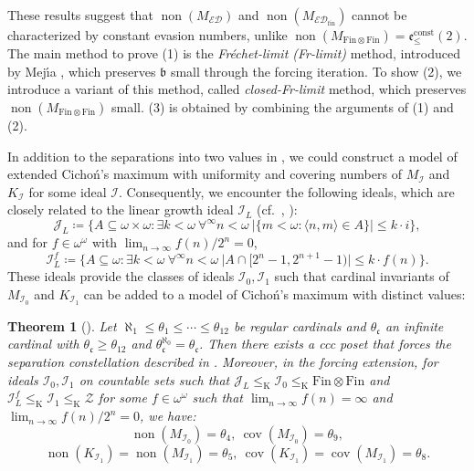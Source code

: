 \documentclass[a4paper,12pt]{amsart}
\newcounter{enuAlph}
\newtheorem{teorema}[enuAlph]{Theorem}
\theoremstyle{definition}
\numberwithin{thm}{section}
\numberwithin{equation}{section}
\newcommand{\oo}{{\omega}^\omega}
\newcommand{\bb}{\mathfrak{b}}
\newcommand{\cc}{\mathfrak{c}}
\newcommand{\ee}{\mathfrak{e}}
\DeclareMathOperator{\non}{non}
\DeclareMathOperator{\cov}{cov}
\newcommand{\ed}{\mathcal{ED}}
\newcommand{\I}{\mathscr{I}}
\newcommand{\J}{\mathscr{J}}
\newcommand{\edfin}{\mathcal{ED}_\mathrm{fin}}
\newcommand{\finfin}{\mathrm{Fin}\otimes\mathrm{Fin}}
\newcommand{\Z}{\mathcal{Z}}
\renewcommand{\subset}{\subseteq}
\newcommand{\IL}{\I_{L}}
\newcommand{\eec}{\ee^{\mathrm{const}}}
\begin{document}
    These results suggest that $\non(M_{\ed})$ and $\non(M_{\edfin})$ cannot be characterized by constant evasion numbers, unlike $\non(M_{\finfin})=\eec_{\leq}(2)$.
    The main method to prove (1) is the \emph{Fr\'{e}chet-limit (Fr-limit)} method, introduced by Mej\'{\i}a \cite{Mej19}, which preserves $\bb$ small through the forcing iteration. To show (2), we introduce a variant of this method, called \emph{closed-Fr-limit} method, which preserves $\non(M_{\finfin})$ small. (3) is obtained by combining the arguments of (1) and (2).
    
    In addition to the separations into two values in , we could construct a model of extended Cicho\'n's maximum with uniformity and covering numbers of $M_\I$ and $K_\I$ for some ideal $\I$. Consequently, we encounter the following ideals, which are closely related to the linear growth ideal $\I_L$ (cf.\ {\cite[Page 56]{Hru11}, \cite[Page 3]{BM14}}):
    \[
    \J_L \coloneqq \{A\subset\omega\times\omega: \exists k<\omega~\forall^{\infty} n<\omega~\lvert\{m<\omega\colon\langle n, m\rangle\in A\}\rvert \leq k\cdot i\},
    \]
    and for $f\in\oo$ with $\textstyle\lim_{n\to\infty}f(n)/2^n=0$,
    \[
    \IL^f\coloneqq\{A\subset\omega\colon\exists k<\omega~\forall^\infty n<\omega~\lvert A\cap [2^n-1, 2^{n+1}-1)\rvert\leq k\cdot f(n)\}.
    \]
    These ideals provide the classes of ideals $\I_0, \I_1$ such that cardinal invariants of $M_{\I_0}$ and $K_{\I_1}$ can be added to a model of Cicho\'n's maximum with distinct values: 

    \begin{teorema}[] \label{mainthm:ext_CM}
        Let $\aleph_1\leq\theta_1\leq\cdots\leq\theta_{12}$ be regular cardinals and $\theta_\cc$ an infinite cardinal with $\theta_\cc\geq\theta_{12}$ and $\theta_\cc^{\aleph_0}=\theta_\cc$. Then there exists a ccc poset that forces the separation constellation described in .
        Moreover, in the forcing extension, for ideals $\I_0, \I_1$ on countable sets such that $\J_L \leq_{\mathrm{K}} \I_0 \leq_{\mathrm{K}} \finfin$ and $\I_L^f \leq_{\mathrm{K}} \I_1 \leq_{\mathrm{K}} \Z$ for some $f\in\omega^\omega$ such that $\textstyle\lim_{n\to\infty}f(n)=\infty$ and $\textstyle\lim_{n\to\infty}f(n)/2^n=0$, we have:
        \[\non(M_{\I_0})=\theta_4,~\cov(M_{\I_0})=\theta_9,\]
        \[\non(K_{\I_1})=\non(M_{\I_1})=\theta_5,~\cov(K_{\I_1})=\cov(M_{\I_1})=\theta_8.\]
    \end{teorema}
    
\end{document}
